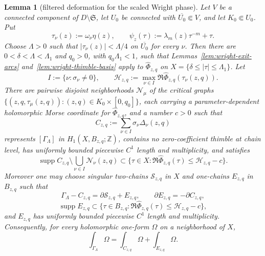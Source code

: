\documentclass[reqno]{article}
\newtheorem{lem}[theorem]{Lemma}
\theoremstyle{definition}
\theoremstyle{remark}
\theoremstyle{plain}
\begin{document}
\begin{lem}[filtered deformation for the scaled Wright phase]\label{lem:filtered-wright}
Let $V$ be a connected component of $D\setminus\mathfrak S$, let $U_0$ be connected with $\overline{U_0}\Subset V$, and let $K_0\Subset U_0$. Put
$$\tau_\nu(z):=\omega_\nu\eta(z),\qquad \psi_z(\tau):=\lambda_m(z)\tau^{-m}+\tau.$$
Choose $\Lambda>0$ such that $|\tau_\nu(z)|<\Lambda/4$ on $\overline{U_0}$ for every $\nu$. Then there are $0<\delta<\Lambda<\Lambda_1$ and $q_0>0$, with $q_0\Lambda_1<1$, such that Lemmas~\ref{lem:wright-exit-arcs} and~\ref{lem:wright-thimble-basis} apply to $\widehat\Phi_{z,q}$ on $X=\{\delta\le |\tau|\le\Lambda_1\}$. Let
$$I:=\{\nu:\sigma_\nu\ne0\},\qquad
\mathcal H_{z,q}:=\max_{\nu\in I}\Re\widehat\Phi_{z,q}(\tau_\nu(z,q)).$$
There are pairwise disjoint neighborhoods $\mathcal N_\mu$ of the critical graphs $\{(z,q,\tau_\mu(z,q)):(z,q)\in K_0\times[0,q_0]\}$, each carrying a parameter-dependent holomorphic Morse coordinate for $\widehat\Phi_{z,q}$, and a number $c>0$ such that
$$C_{z,q}:=\sum_{\nu\in I}\sigma_\nu\Delta_\nu(z,q)$$
represents $[\Gamma_\Lambda]$ in $H_1(X,B_{z,q};\mathbb Z)$, contains no zero-coefficient thimble at chain level, has uniformly bounded piecewise $C^1$ length and multiplicity, and satisfies
$$\operatorname{supp}C_{z,q}\setminus\bigcup_{\nu\in I}\mathcal N_\nu(z,q)
\subset\{\tau\in X:\Re\widehat\Phi_{z,q}(\tau)\le\mathcal H_{z,q}-c\}.$$
Moreover one may choose singular two-chains $\mathcal S_{z,q}$ in $X$ and one-chains $E_{z,q}$ in $B_{z,q}$ such that
$$\Gamma_\Lambda-C_{z,q}=\partial\mathcal S_{z,q}+E_{z,q},\qquad
\partial E_{z,q}=-\partial C_{z,q},$$
$$\operatorname{supp}E_{z,q}\subset\{\tau\in B_{z,q}:\Re\widehat\Phi_{z,q}(\tau)\le\mathcal H_{z,q}-c\},$$
and $E_{z,q}$ has uniformly bounded piecewise $C^1$ length and multiplicity. Consequently, for every holomorphic one-form $\Omega$ on a neighborhood of $X$,
$$\int_{\Gamma_\Lambda}\Omega=\int_{C_{z,q}}\Omega+\int_{E_{z,q}}\Omega.$$
\end{lem}
\end{document}
